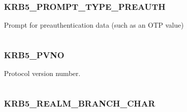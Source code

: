 \documentclass[letterpaper,10pt,english]{sphinxmanual}
\begin{document}
\subsubsection{KRB5\_PROMPT\_TYPE\_PREAUTH}
\label{appdev/refs/macros/KRB5_PROMPT_TYPE_PREAUTH:krb5-prompt-type-preauth-data}\label{appdev/refs/macros/KRB5_PROMPT_TYPE_PREAUTH::doc}\label{appdev/refs/macros/KRB5_PROMPT_TYPE_PREAUTH:krb5-prompt-type-preauth}

\begin{fulllineitems}
\label{appdev/refs/macros/KRB5_PROMPT_TYPE_PREAUTH:KRB5_PROMPT_TYPE_PREAUTH}
\end{fulllineitems}


Prompt for preauthentication data (such as an OTP value)

\begin{tabulary}{\linewidth}{|L|L|}
\hline

 & 
\\\hline
\end{tabulary}



\subsubsection{KRB5\_PVNO}
\label{appdev/refs/macros/KRB5_PVNO:krb5-pvno-data}\label{appdev/refs/macros/KRB5_PVNO::doc}\label{appdev/refs/macros/KRB5_PVNO:krb5-pvno}

\begin{fulllineitems}
\label{appdev/refs/macros/KRB5_PVNO:KRB5_PVNO}
\end{fulllineitems}


Protocol version number.

\begin{tabulary}{\linewidth}{|L|L|}
\hline

 & 
\\\hline
\end{tabulary}



\subsubsection{KRB5\_REALM\_BRANCH\_CHAR}
\label{appdev/refs/macros/KRB5_REALM_BRANCH_CHAR::doc}\label{appdev/refs/macros/KRB5_REALM_BRANCH_CHAR:krb5-realm-branch-char}\label{appdev/refs/macros/KRB5_REALM_BRANCH_CHAR:krb5-realm-branch-char-data}
\end{document}

